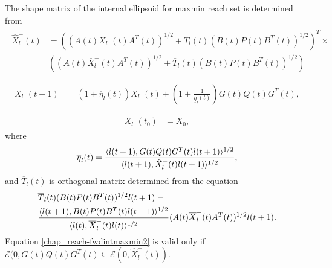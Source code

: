 \documentclass[letterpaper,10pt,english]{sphinxmanual}
\begin{document}
The shape matrix of the internal ellipsoid for maxmin reach set is
determined from
\label{chap_reach:equation-fwdintmaxmin1}\begin{gather}
\begin{split}\hat{X}^-_l(t) & =
\left((A(t)\overline{X}^-_l(t)A^T(t))^{1/2} +
\overline{T}_l(t)(B(t)P(t)B^T(t))^{1/2}\right)^T
\times \nonumber \\
& \left((A(t)\overline{X}^-_l(t)A^T(t))^{1/2} +
\overline{T}_l(t)(B(t)P(t)B^T(t))^{1/2}\right)\\\end{split}\label{chap_reach-fwdintmaxmin1}
\end{gather}\label{chap_reach:equation-fwdintmaxmin2}\begin{gather}
\begin{split}\overline{X}^-_l(t+1) & =
(1+\overline{\eta}_l(t))\hat{X}^-_l(t) +
\left(1+\frac{1}{\underline{\eta}_l(t)}\right)
G(t)Q(t)G^T(t), \\\end{split}\label{chap_reach-fwdintmaxmin2}
\end{gather}\label{chap_reach:equation-fwdintmaxmin3}\begin{gather}
\begin{split}\overline{X}^-_l(t_0) & = X_0,\end{split}\label{chap_reach-fwdintmaxmin3}
\end{gather}
where
\begin{gather}
\begin{split}\overline{\eta}_l(t) = \frac{\langle l(t+1),
G(t)Q(t)G^T(t)l(t+1)\rangle^{1/2}}{\langle l(t+1),
\hat{X}^-_l(t)l(t+1)\rangle^{1/2}},\end{split}\notag
\end{gather}
and $\overline{T}_l(t)$ is orthogonal matrix determined from the
equation
\begin{gather}
\begin{split}\begin{aligned}
& \overline{T}_l(t)(B(t)P(t)B^T(t))^{1/2}l(t+1) = \\
& \frac{\langle l(t+1),
B(t)P(t)B^T(t)l(t+1)\rangle^{1/2}}{\langle l(t),
\overline{X}^-_l(t)l(t)\rangle^{1/2}}(A(t)\overline{X}^-_l(t)A^T(t))^{1/2}l(t+1).\end{aligned}\end{split}\notag
\end{gather}
Equation \eqref{chap_reach-fwdintmaxmin2} is valid only if
${\mathcal E}(0,G(t)Q(t)G^T(t)\subseteq{\mathcal E}(0,\hat{X}^-_l(t))$.
\end{document}
